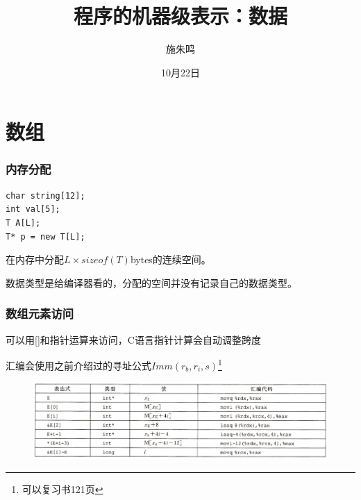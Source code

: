 \documentclass[12pt,AutoFakeBold,aspectratio=169,mathserif]{beamer}
\title{程序的机器级表示：数据}
\author{施朱鸣}
\date{10月22日}
\begin{document}
    \begin{frame}
        \titlepage
    
    \end{frame}

    \section{数组}

    \begin{frame}[fragile]
        \frametitle{内存分配}
    
        \begin{lstlisting}
char string[12];
int val[5];
T A[L];
T* p = new T[L];
        \end{lstlisting}

        在内存中分配\(L\times sizeof(T)\)bytes的连续空间。
        
        数据类型是给编译器看的，分配的空间并没有记录自己的数据类型。
    
    \end{frame}

    \begin{frame}
        \frametitle{数组元素访问}
    
        可以用[]和指针运算来访问，C语言指针计算会自动调整跨度

        汇编会使用之前介绍过的寻址公式\(Imm(r_b,r_i,s)\)\footnote{可以复习书121页}

        \begin{figure}
            \includegraphics[width=\textwidth]{figures/elements2.png}
        \end{figure}
    
    \end{frame}
\end{document}
